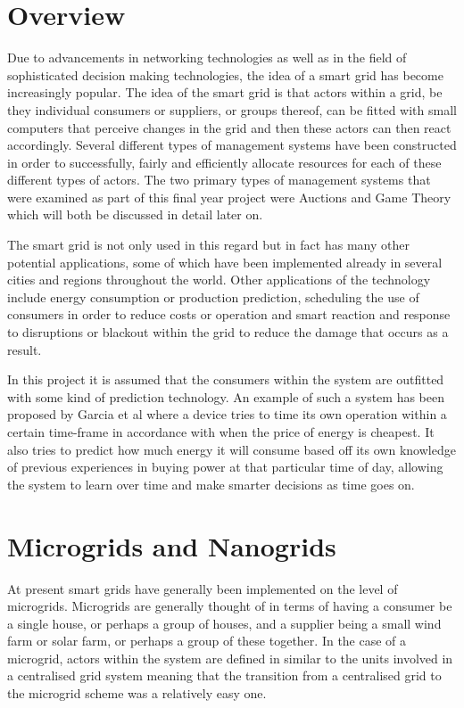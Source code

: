\documentclass[a4paper, notitlepage]{report}
\begin{document}
\section{Overview}
\label{sec:org6c3613a}
Due to advancements in networking technologies as well as in the field of
sophisticated decision making technologies, the idea of a smart grid has become
increasingly popular. The idea of the smart grid is that actors within a grid,
be they individual consumers or suppliers, or groups thereof, can be fitted with
small computers that perceive changes in the grid and then these actors can
then react accordingly. Several different types of management systems have been
constructed in order to successfully, fairly and efficiently allocate resources
for each of these different types of actors. The two primary types of management
systems that were examined as part of this final year project were Auctions and
Game Theory which will both be discussed in detail later on.

The smart grid is not only used in this regard but in fact has many other
potential applications, some of which have been implemented already in several
cities and regions throughout the world. Other applications of the technology
include energy consumption or production prediction, scheduling the use of
consumers in order to reduce costs or operation and smart reaction and response
to disruptions or blackout within the grid to reduce the damage that occurs as a
result.

In this project it is assumed that the consumers within the system are outfitted
with some kind of prediction technology. An example of such a system has been
proposed by Garcia et al \cite{mohsenian2010optimal} where a device tries to time
its own operation within a certain time-frame in accordance with when the price
of energy is cheapest. It also tries to predict how much energy it will consume
based off its own knowledge of previous experiences in buying power at that
particular time of day, allowing the system to learn over time and make smarter
decisions as time goes on.

\section{Microgrids and Nanogrids}
\label{sec:orgcdb6de6}
At present smart grids have generally been implemented on the level of
microgrids. Microgrids are generally thought of in terms of having a consumer
be a single house, or perhaps a group of houses, and a supplier being a small
wind farm or solar farm, or perhaps a group of these together. In the case of a
microgrid, actors within the system are defined in similar to the units involved
in a centralised grid system meaning that the transition from a centralised grid
to the microgrid scheme was a relatively easy one.
\end{document}
